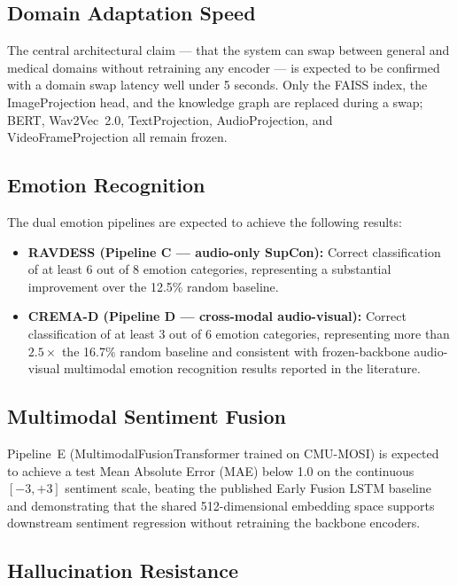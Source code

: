 \documentclass[12pt, a4paper]{article}
\begin{document}
\subsection{Domain Adaptation Speed}

The central architectural claim --- that the system can swap between general
and medical domains without retraining any encoder --- is expected to be
confirmed with a domain swap latency well under 5 seconds. Only the FAISS
index, the ImageProjection head, and the knowledge graph are replaced during a
swap; BERT, Wav2Vec~2.0, TextProjection, AudioProjection, and
VideoFrameProjection all remain frozen.

\subsection{Emotion Recognition}

The dual emotion pipelines are expected to achieve the following results:

\begin{itemize}[leftmargin=1.5em]
  \item \textbf{RAVDESS (Pipeline C --- audio-only SupCon):} Correct
    classification of at least 6 out of 8 emotion categories, representing a
    substantial improvement over the 12.5\% random baseline.
  \item \textbf{CREMA-D (Pipeline D --- cross-modal audio-visual):} Correct
    classification of at least 3 out of 6 emotion categories, representing
    more than $2.5\times$ the 16.7\% random baseline and consistent with
    frozen-backbone audio-visual multimodal emotion recognition results
    reported in the literature.
\end{itemize}

\subsection{Multimodal Sentiment Fusion}

Pipeline~E (MultimodalFusionTransformer trained on CMU-MOSI) is expected to
achieve a test Mean Absolute Error (MAE) below 1.0 on the continuous $[-3,
+3]$ sentiment scale, beating the published Early Fusion LSTM
baseline~\cite{lewis2020rag} and demonstrating that the shared 512-dimensional
embedding space supports downstream sentiment regression without retraining the
backbone encoders.

\subsection{Hallucination Resistance}
\end{document}
